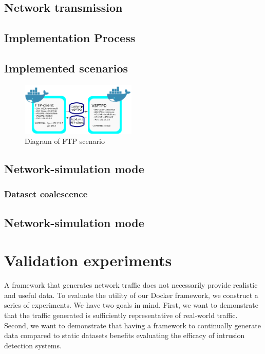\documentclass[sigconf]{acmart}
\begin{document}
\subsection{Network transmission}\label{Sec:Netrand}


\subsection{Implementation Process}

 
\subsection{Implemented scenarios}\label{Sec:ExistScen}


\begin{figure}%
\centering
\includegraphics[width=0.49\textwidth]{images/ftp_new1.png}
\caption{Diagram of FTP scenario}
\end{figure}


\subsection{Network-simulation mode}

\subsubsection{Dataset coalescence}\label{Sec:datasetcreation}


\subsection{Network-simulation mode}




\section{Validation experiments}\label{Sec:Experiments}

A framework that generates network traffic does not necessarily provide realistic and useful data. To evaluate the utility of our Docker framework, we construct a series of experiments. We have two goals in mind. First, we want to demonstrate that the traffic generated is sufficiently representative of real-world traffic.
Second, we want to demonstrate that having a framework to continually generate data compared to static datasets benefits evaluating the efficacy of intrusion detection systems.
\end{document}
